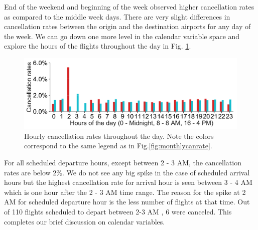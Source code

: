 \documentclass[12pt]{article}
\begin{document}
End of the weekend and beginning of the week observed higher cancellation rates as compared to the middle week days. There are very slight differences in cancellation rates between the origin and the destination airports for any day of the week. We can go down one more level in the calendar variable space and explore the hours of the flights throughout the day in Fig. \ref{fig:hourlycanrate}.
\begin{figure}[h!]
\begin{center}
\includegraphics[width=6in]{hourly_canrate.pdf}
\end{center}
\caption{\label{fig:hourlycanrate}
Hourly cancellation rates throughout the day. Note the colors correspond to the same legend as in Fig.\ref{fig:monthlycanrate}.}
\end{figure}
For all scheduled departure hours, except between 2 - 3 AM, the cancellation rates are below $2\%$. We do not see any big spike in the case of scheduled arrival hours but the highest cancellation rate for arrival hour is seen between 3 - 4 AM which is one hour after the 2 - 3 AM time range. The reason for the spike at 2 AM for scheduled departure hour is the less number of flights at that time. Out of 110 flights scheduled to depart between 2-3 AM , 6 were canceled. This completes our brief discussion on calendar variables.
\end{document}

